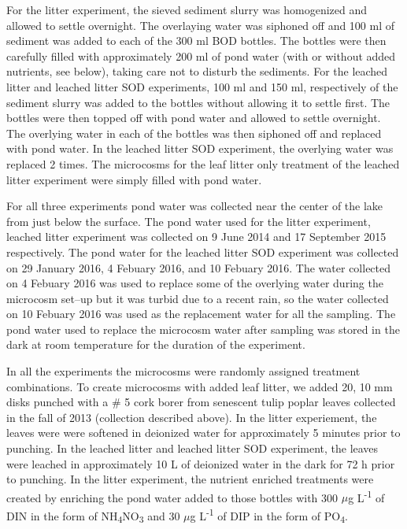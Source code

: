 For the litter experiment, the sieved sediment slurry was homogenized and allowed to settle overnight. The overlaying water was siphoned off and 100 ml of sediment was added to each of the 300 ml BOD bottles. The bottles were then carefully filled with approximately 200 ml of pond water (with or without added nutrients, see below), taking care not to disturb the sediments. For the leached litter and leached litter SOD experiments, 100 ml and 150 ml, respectively of the sediment slurry was added to the bottles without allowing it to settle first. The bottles were then topped off with pond water and allowed to settle overnight. The overlying water in each of the bottles was then siphoned off and replaced with pond water. In the leached litter SOD experiment, the overlying water was replaced 2 times. The microcosms for the leaf litter only treatment of the leached litter experiment were simply filled with pond water.

For all three experiments pond water was collected near the center of the lake from just below the surface.  The pond water used for the litter experiment, leached litter experiment was collected on 9 June 2014 and 17 September 2015 respectively. The pond water for the leached litter SOD experiment was collected on 29 January 2016, 4 Febuary 2016, and 10 Febuary 2016. The water collected on 4 Febuary 2016 was used to replace some of the overlying water during the microcosm set--up but it was turbid due to a recent rain, so the water collected on 10 Febuary 2016 was used as the replacement water for all the sampling. The pond water used to replace the microcosm water after sampling was stored in the dark at room temperature for the duration of the experiment.

In all the experiments the microcosms were randomly assigned treatment combinations. To create microcosms with added leaf litter, we added 20, 10 mm disks punched with a \# 5 cork borer from senescent tulip poplar leaves collected in the fall of 2013 (collection described above). In the litter experiement, the leaves were were softened in deionized water for approximately 5 minutes prior to punching. In the leached litter and leached litter SOD experiment, the leaves were leached in approximately 10 L of deionized water in the dark for 72 h prior to punching. In the litter experiment, the nutrient enriched treatments were created by enriching the pond water added to those bottles with 300 $\mu$g L\textsuperscript{-1} of DIN in the form of NH\textsubscript{4}NO\textsubscript{3} and 30 $\mu$g L\textsuperscript{-1} of DIP in the form of PO\textsubscript{4}.

